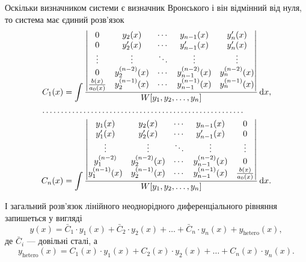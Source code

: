 Оскільки визначником системи є визначник Вронського і він відмінний від нуля, то система має єдиний роз\-в'яз\-ок
\begin{equation*}
	\begin{aligned}
		C_1(x) &= \int \frac{\begin{vmatrix} 0 & y_2(x) & \cdots & y_{n - 1}(x) & y_n'(x) \\ 0 & y_2'(x) & \cdots & y_{n - 1}'(x) & y_n'(x) \\ \vdots & \vdots & \ddots & \vdots & \vdots \\ 0 & y_2^{(n - 2)}(x) & \cdots & y_{n - 1}^{(n - 2)}(x) & y_n^{(n - 2)}(x) \\ \frac{b(x)}{a_0(x)} & y_2^{(n - 1)}(x) & \cdots & y_{n - 1}^{(n - 1)}(x) & y_n^{(n - 1)}(x) \end{vmatrix}}{W[y_1, y_2, \ldots, y_n]} \mathop{}\!\mathrm{d} x, \\
		\ldots \ldots & \ldots \ldots \ldots \ldots \ldots \ldots \ldots \ldots \ldots \ldots \ldots \ldots \ldots \ldots \ldots \ldots \\
		C_n(x) &= \int \frac{\begin{vmatrix} y_1(x) & y_2(x) & \cdots & y_{n - 1}(x) & 0 \\ y_1'(x) & y_2'(x) & \cdots & y_{n - 1}'(x) & 0 \\ \vdots & \vdots & \ddots & \vdots & \vdots \\ y_1^{(n - 2)} & y_2^{(n - 2)}(x) & \cdots & y_{n - 1}^{(n - 2)}(x) & 0 \\ y_1^{(n - 1)}(x) & y_2^{(n - 1)}(x) & \cdots & y_{n - 1}^{(n - 1)}(x) & \frac{b(x)}{a_0(x)} \end{vmatrix}}{W[y_1, y_2, \ldots, y_n]} \mathop{}\!\mathrm{d} x.
	\end{aligned}
\end{equation*}

І загальний розв’язок лінійного неоднорідного диференціального рівняння запишеться у вигляді
\begin{equation*}
	y(x) = \bar C_1 \cdot y_1(x) + \bar C_2 \cdot y_2(x) + \ldots + \bar C_n \cdot y_n(x) + y_{\text{hetero}}(x),
\end{equation*}
де $\bar C_i$ --- довільні сталі, а
\begin{equation*}
	y_{\text{hetero}}(x) = C_1(x) \cdot y_1(x) + C_2(x) \cdot y_2(x) + \ldots + C_n(x) \cdot y_n(x).
\end{equation*}

